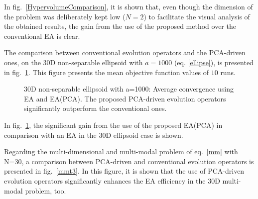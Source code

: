 In fig.\ \ref{HypervolumeComparison}, it is shown that, even though the dimension of the problem was deliberately kept low ($N\!=\!2$) to facilitate the visual analysis of the obtained results, the gain from the use of the proposed method over the conventional EA is clear.  

The comparison between conventional evolution operators and the PCA-driven ones, on the 30D non-separable ellipsoid with $a\!=\!1000$ (eq. \ref{ellipse}), is presented in fig.\ \ref{Ellt3}. This figure presents the mean objective function values of $10$ runs. 

\begin{figure}[h!]
\begin{minipage}[b]{1\linewidth}
 \centering
\end{minipage}
\caption{30D non-separable ellipsoid with a=1000: Average convergence using EA and EA(PCA). The proposed PCA-driven evolution operators significantly outperform the conventional ones.} 
\label{Ellt3}
\end{figure}

In fig.\ \ref{Ellt3}, the significant gain from the use of the proposed EA(PCA) in comparison with an EA in the 30D ellipsoid case is shown.

Regarding the multi-dimensional and multi-modal problem of eq.\ \ref{mm} with N=30, a comparison between PCA-driven and conventional evolution operators is presented in fig.\ \ref{mmt3}.  In this figure, it is shown that the use of PCA-driven evolution operators significantly enhances the EA efficiency in the 30D multi-modal problem, too.


